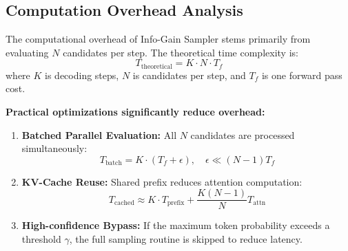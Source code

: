\subsection{Computation Overhead Analysis}
\label{appendix:computation}

The computational overhead of Info-Gain Sampler stems primarily from evaluating $N$ candidates per step. The theoretical time complexity is:
\begin{equation}
T_{\text{theoretical}} = K \cdot N \cdot T_f
\label{eq:complexity}
\end{equation}
where $K$ is decoding steps, $N$ is candidates per step, and $T_f$ is one forward pass cost.

\textbf{Practical optimizations significantly reduce overhead:}
\begin{enumerate}
    \item \textbf{Batched Parallel Evaluation:} All $N$ candidates are processed simultaneously:
    \begin{equation}
    T_{\text{batch}} = K \cdot (T_f + \epsilon), \quad \epsilon \ll (N-1)T_f
    \end{equation}
    
    \item \textbf{KV-Cache Reuse:} Shared prefix reduces attention computation:
    \begin{equation}
    T_{\text{cached}} \approx K \cdot T_{\text{prefix}} + \frac{K(N-1)}{N} T_{\text{attn}}
    \end{equation}
    
    \item \textbf{High-confidence Bypass:} If the maximum token probability exceeds a threshold $\gamma$, the full sampling routine is skipped to reduce latency.
\end{enumerate}


